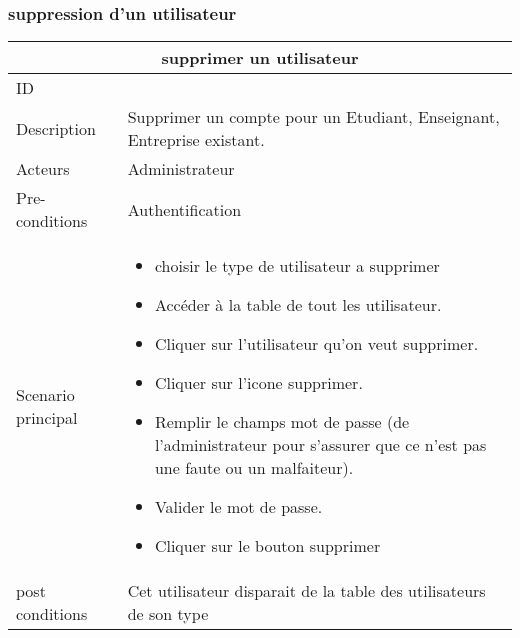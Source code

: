 \documentclass[11pt,fleqn]{book} %
\begin{document}
\subsubsection{suppression d'un utilisateur}
\begin{center}
\begin{tabularx}{1\textwidth} { | p{4cm} | >{\raggedright\arraybackslash}X |  }
  \hline
  \multicolumn{2}{|c|}{supprimer un utilisateur} \\
 \hline
 ID & 2  \\
 \hline
 Description  & Supprimer un compte pour un Etudiant, Enseignant, Entreprise existant.   \\
  \hline
 Acteurs  & Administrateur   \\
  \hline
 Pre-conditions  & Authentification  \\
  \hline
 Scenario principal  & 
 \begin{itemize}
     \item choisir le type de utilisateur a supprimer
     \item  Accéder à la table de tout les utilisateur.
      \item Cliquer sur l’utilisateur qu’on veut supprimer.
      \item Cliquer sur l’icone supprimer.
      \item Remplir le champs mot de passe (de l’administrateur pour s’assurer que ce n’est pas une faute ou un malfaiteur).
      \item Valider le mot de passe.
       \item Cliquer sur le bouton supprimer
 \end{itemize}\\
  \hline
 post conditions  & Cet utilisateur disparait de la table des utilisateurs de son type  \\
  \hline
\end{tabularx}
\label{tbl:nicetablelesstable}
\end{center}

\end{document}
